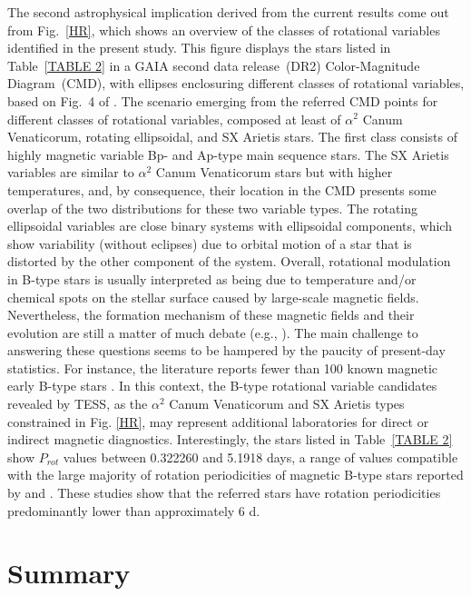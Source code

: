 \documentclass[RNAAS]{aastex63}
\begin{document}
The second astrophysical implication derived from the current results come out from Fig.~\ref{HR}, which shows an overview of the classes of rotational variables identified in the present study. This figure displays the stars listed in Table~\ref{TABLE 2} in a GAIA second data release~(DR2) Color-Magnitude Diagram~(CMD), with ellipses enclosuring different classes of rotational variables, based on Fig.~4 of \citet{Gaia2019}. The scenario emerging from the referred CMD points for different classes of rotational variables, composed at least of $\alpha^2$ Canum Venaticorum, rotating ellipsoidal, and SX Arietis stars. The first class consists of highly magnetic variable Bp- and Ap-type main sequence stars. The SX Arietis variables are similar to $\alpha^2$ Canum Venaticorum stars but with higher temperatures, and, by consequence, their location in the CMD presents some overlap of the two distributions for these two variable types. The rotating ellipsoidal variables are close binary systems with ellipsoidal components, which show variability (without eclipses) due to orbital motion of a star that is distorted by the other component of the system. Overall, rotational modulation in B-type stars is usually interpreted as being due to temperature and/or chemical spots on the stellar surface caused by large-scale magnetic fields. Nevertheless, the formation mechanism of these magnetic fields and their evolution are still a matter of much debate (e.g., \citealp{Schneider2016,Villebrun2019,Landstreet2007,Landstreet2008,Fossati2016,Shultz2019}). The main challenge to answering these questions seems to be hampered by the paucity of present-day statistics. For instance, the literature reports fewer than 100 known magnetic early B-type stars \citep{Shultz2018}. In this context, the B-type rotational variable candidates revealed by TESS, as the $\alpha^2$ Canum Venaticorum and SX Arietis types constrained in Fig. \ref{HR}, may represent additional laboratories for direct or indirect magnetic diagnostics. Interestingly, the stars listed in Table~\ref{TABLE 2} show $P_{rot}$ values between 0.322260 and 5.1918 days, a range of values compatible with the large majority of rotation periodicities of magnetic B-type stars reported by \citet{Shultz2018} and \citet{Bowman2018}. These studies show that the referred stars have rotation periodicities predominantly lower than approximately 6 d.

\section{Summary} \label{sec:summary}
\end{document}
